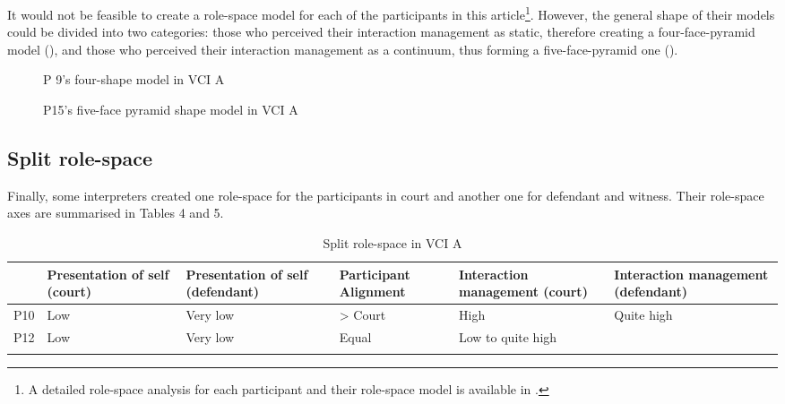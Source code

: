 \documentclass[output=paper]{langsci/langscibook}
\begin{document}
It would not be feasible to create a role-space model for each of the participants in this article\footnote{A detailed role-space analysis for each participant and their role-space model is available in \citet{Devaux2017b}.}. However, the general shape of their models could be divided into two categories: those who perceived their interaction management as static, therefore creating a four-face-pyramid model (), and those who perceived their interaction management as a continuum, thus forming a five-face-pyramid one ().  

  

 

\begin{figure}
\caption{P 9's four-shape model in \textsc{VCI} A}\label{fig:devaux:3}
\end{figure}

\begin{figure}
\caption{P15's five-face pyramid shape model in \textsc{VCI} A\label{fig:devaux:4}}
\end{figure}

\subsection{Split role-space}
\label{sub:devaux:5.4}
Finally, some interpreters created one role-space for the participants in court and another one for defendant and witness. Their role-space axes are summarised in Tables 4 and 5. 

\begin{table}
\begin{tabularx}{\textwidth}{XXXXXX}
	\lsptoprule
& {Presentation of self (court)} & {Presentation of self (defendant)} & {Participant Alignment} & {Interaction management (court)} & {Interaction management (defendant)}\\\midrule
P10 & Low & Very low & > Court & High & Quite high\\
P12 & Low & Very low & Equal & \multicolumn{2}{X}{Low to quite high}\\
\lspbottomrule
\end{tabularx}
\caption{Split role-space in \textsc{VCI} A\label{tab:devaux:4}}
\end{table}
\end{document}
